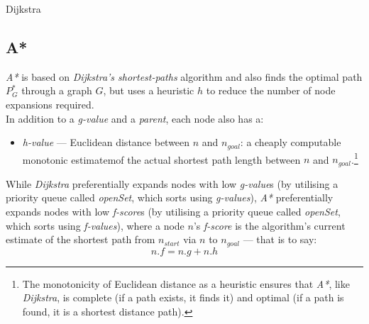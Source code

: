\documentclass[12pt,notitlepage]{report}
\begin{document}
\begin{algorithm}
  \SetAlgoLined\DontPrintSemicolon
  \setcounter{AlgoLine}{0}
  \caption{{\sc Dijkstra}}
\end{algorithm} 

\subsection {A*}

{\em A*} is based on {\em Dijkstra's shortest-paths} algorithm and also finds the optimal path $P^{*}_{G}$ through a graph $G$, but uses a heuristic $h$ to reduce the number of node expansions required\cite{Hart68}.\\

\noindent
In addition to a {\em g-value} and a {\em parent}, each node also has a:
\begin{itemize}
\item {\em h-value} --- Euclidean distance between {$n$} and {$n_{goal}$}: a cheaply computable monotonic estimatemof the actual shortest path length between $n$ and $n_{goal}$.\footnote{The monotonicity of Euclidean distance as a heuristic ensures that {\em A*}, like {\em Dijkstra}, is complete (if a path exists, it finds it) and optimal (if a path is found, it is a shortest distance path).} 
\end{itemize}

\noindent
While {\em Dijkstra} preferentially expands nodes with low {\em g-value}s (by utilising a priority queue called {\em openSet}, which sorts using {\em g-values}), {\em A*} preferentially expands nodes with low {\em f-score}s (by utilising a priority queue called {\em openSet}, which sorts using {\em f-values}), where a node $n$'s {\em f-score} is the algorithm's current estimate of the shortest path from $n_{start}$ via $n$ to $n_{goal}$ --- that is to say:
\begin{equation}
n.f = n.g + n.h
\end{equation}
\end{document}
